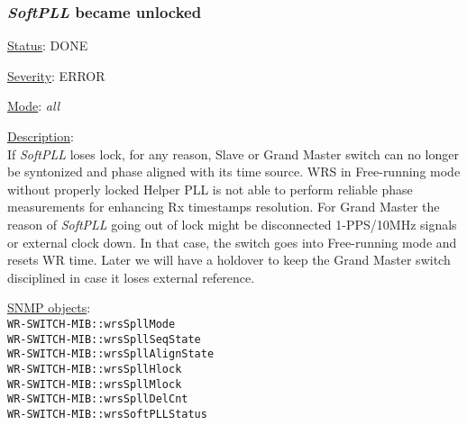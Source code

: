 \subsubsection{\bf \emph{SoftPLL} became unlocked}
		\label{fail:timing:spll_unlock}
		\begin{packed_enum}
			\item [] \underline{Status}: DONE
			\item [] \underline{Severity}: ERROR
			\item [] \underline{Mode}: \emph{all}
			\item [] \underline{Description}:\\
				If \emph{SoftPLL} loses lock, for any reason, Slave or Grand Master
				switch can no longer be syntonized and phase aligned with its time
				source. WRS in Free-running mode without properly locked Helper PLL is
				not able to perform reliable phase measurements for enhancing Rx
				timestamps resolution. For Grand Master the reason of \emph{SoftPLL}
				going out of lock might be disconnected 1-PPS/10MHz signals or external
				clock down. In that case, the switch goes into Free-running mode and
				resets WR time. Later we will have a holdover to keep the Grand Master
				switch disciplined in case it loses external reference.
			\item [] \underline{SNMP objects}:\\
				\texttt{WR-SWITCH-MIB::wrsSpllMode}\\
				\texttt{WR-SWITCH-MIB::wrsSpllSeqState}\\
				\texttt{WR-SWITCH-MIB::wrsSpllAlignState}\\
				\texttt{WR-SWITCH-MIB::wrsSpllHlock}\\
				\texttt{WR-SWITCH-MIB::wrsSpllMlock}\\
				\texttt{WR-SWITCH-MIB::wrsSpllDelCnt}\\
				\texttt{WR-SWITCH-MIB::wrsSoftPLLStatus}
		\end{packed_enum}

